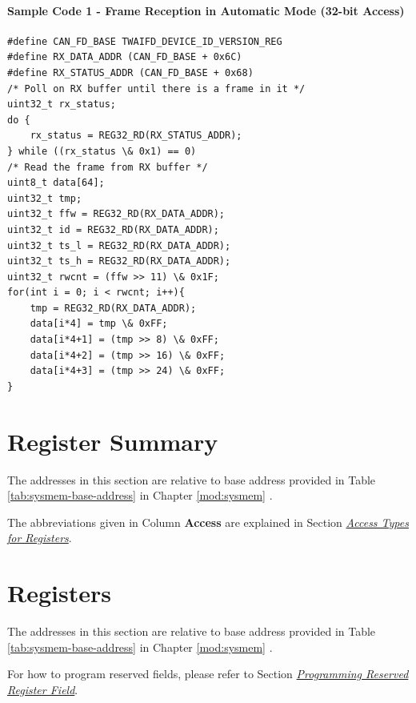\documentclass[main\_\_EN.tex]{subfiles}
\begin{document}
\paragraph{Sample Code 1 - Frame Reception in Automatic Mode (32-bit Access)}
\begin{lstlisting}
#define CAN_FD_BASE TWAIFD_DEVICE_ID_VERSION_REG
#define RX_DATA_ADDR (CAN_FD_BASE + 0x6C)
#define RX_STATUS_ADDR (CAN_FD_BASE + 0x68)
/* Poll on RX buffer until there is a frame in it */
uint32_t rx_status;
do {
    rx_status = REG32_RD(RX_STATUS_ADDR);
} while ((rx_status \& 0x1) == 0)
/* Read the frame from RX buffer */
uint8_t data[64];
uint32_t tmp;
uint32_t ffw = REG32_RD(RX_DATA_ADDR);
uint32_t id = REG32_RD(RX_DATA_ADDR);
uint32_t ts_l = REG32_RD(RX_DATA_ADDR);
uint32_t ts_h = REG32_RD(RX_DATA_ADDR);
uint32_t rwcnt = (ffw >> 11) \& 0x1F;
for(int i = 0; i < rwcnt; i++){
    tmp = REG32_RD(RX_DATA_ADDR);
    data[i*4] = tmp \& 0xFF;
    data[i*4+1] = (tmp >> 8) \& 0xFF;
    data[i*4+2] = (tmp >> 16) \& 0xFF;
    data[i*4+3] = (tmp >> 24) \& 0xFF;
}
\end{lstlisting}





\newpage
\hypertarget{twai-reg-summ}{}
\section{Register Summary}
\label{sec:twai-reg-summ}

The addresses in this section are relative to \modulename{} base address provided in Table \ref{tab:sysmem-base-address} in Chapter \ref{mod:sysmem} \textit{}.

The abbreviations given in Column \textbf{Access} are explained in Section \hyperref[glossary-access-types]{\textit{Access Types for Registers}}.





\newpage
\section{Registers}


The addresses in this section are relative to \modulename{} base address provided in Table \ref{tab:sysmem-base-address} in Chapter \ref{mod:sysmem} \textit{}.

For how to program reserved fields, please refer to Section \hyperref[programming-reserved-field]{\textit{Programming Reserved Register Field}}.




\end{document}

